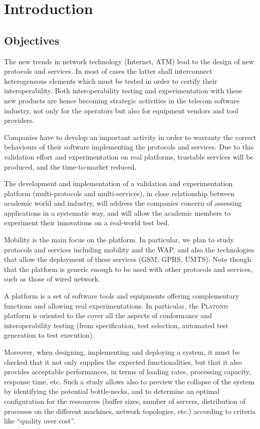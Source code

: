 \section{Introduction}

\subsection{Objectives}

The new trends in network technology (Internet, ATM) lead to the
design of new protocols and services. In most of cases the latter
shall interconnect heterogeneous elements which must be tested in
order to certify their interoperability. Both interoperability testing
and experimentation with these new products are hence becoming
strategic activities in the telecom software industry, not only for
the operators but also for equipment vendors and tool providers.

Companies have to develop an important activity in order to warranty
the correct behaviours of their software implementing the protocols
and services. Due to this validation effort and experimentation on
real platforms, trustable services will be produced, and the
time-to-market reduced.

The development and implementation of a validation and experimentation
platform (multi-protocols and multi-services), in close relationship
between academic world and industry, will address the companies
concern of assessing applications in a systematic way, and will allow
the academic members to experiment their innovations on a real-world
test bed.

Mobility is the main focus on the platform. In particular, we plan to
study protocols and services including mobility and the WAP, and also
the technologies that allow the deployment of these services (GSM, GPRS,
UMTS). Note though that the platform is generic enough to be used with
other protocols and services, such as those of wired
network.

A platform is a set of software tools and equipments offering
complementary functions and allowing real experimentations. In
particular, the \textsc{Platonis} platform is oriented to the cover
all the aspects of conformance and interoperability testing (from
specification, test selection, automated test generation to test
execution).

Moreover, when designing, implementing and deploying a system, it must
be checked that it not only supplies the expected functionalities, but
that it also provides acceptable performances, in terms of loading
rates, processing capacity, response time, etc. Such a study allows
also to preview the collapse of the system by identifying the
potential bottle-necks, and to determine an optimal configuration for
the ressources (buffer sizes, number of servers, distribution of
processes on the different machines, network topologies, etc.)
according to criteria like ``quality over cost''.

